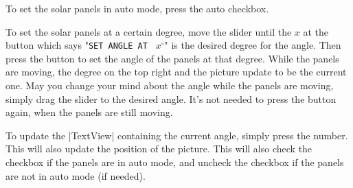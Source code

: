 \documentclass{article}
\begin{document}
			To set the solar panels in auto mode, press the auto checkbox.

			
			To set the solar panels at a certain degree, move the slider until the $x$ at the button which says "\verb|SET ANGLE AT | $x^{\circ}$" is the desired degree for the angle.
			Then press the button to set the angle of the panels at that degree.
			While the panels are moving, the degree on the top right and the picture update to be the current one.
			May you change your mind about the angle while the panels are moving, simply drag the slider to the desired angle.
			It's not needed to press the button again, when the panels are still moving.
			
			To update the |TextView| containing the current angle, simply press the number.
			This will also update the position of the picture.
			This will also check the checkbox if the panels are in auto mode, and uncheck the checkbox if the panels are not in auto mode (if needed).
		
\end{document}
